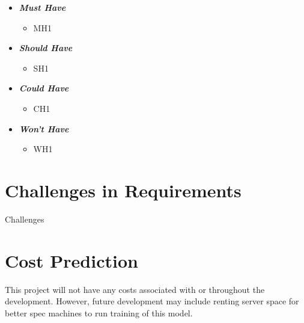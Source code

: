 \begin{itemize}
    \item \textbf{\textit{Must Have}}
        \begin{itemize}\label{NFMH}
            \item MH1
        \end{itemize}
    \item \textbf{\textit{Should Have}}
        \begin{itemize}\label{NFSH}
            \item SH1
        \end{itemize}
    \item \textbf{\textit{Could Have}}
        \begin{itemize}\label{NFCH}
            \item CH1
        \end{itemize}
    \item \textbf{\textit{Won't Have}}
        \begin{itemize}\label{NFWH}
            \item WH1
        \end{itemize}
\end{itemize}

\section{Challenges in Requirements}

Challenges

\section{Cost Prediction}

This project will not have any costs associated with or throughout the development. However, future development may include renting server space for better spec machines to run training of this model.